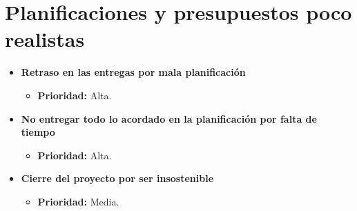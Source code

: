 \documentclass[spanish,a4paper,12pt]{report}	%
\begin{document}
\section{Planificaciones y presupuestos poco realistas}
	\begin{itemize}
		\item \textbf{Retraso en las entregas por mala planificación}
			\begin{itemize}
				\item \textbf{Prioridad: }Alta.
			\end{itemize}
		
		\item \textbf{No entregar todo lo acordado en la planificación por falta de tiempo}
			\begin{itemize}
				\item \textbf{Prioridad: }Alta.
			\end{itemize}
		
		\item \textbf{Cierre del proyecto por ser insostenible}
			\begin{itemize}
				\item \textbf{Prioridad: }Media.
			\end{itemize}
	\end{itemize}
%
\end{document}
